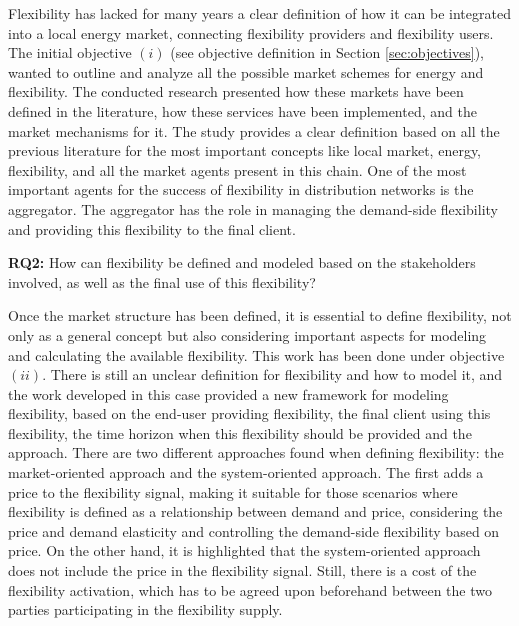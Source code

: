 Flexibility has lacked for many years a clear definition of how it can be integrated into a local energy market, connecting flexibility providers and flexibility users. The initial objective $(i)$ (see objective definition in Section \ref{sec:objectives}), wanted to outline and analyze all the possible market schemes for energy and flexibility. The conducted research presented how these markets have been defined in the literature, how these services have been implemented, and the market mechanisms for it. The study provides a clear definition based on all the previous literature for the most important concepts like local market, energy, flexibility, and all the market agents present in this chain. One of the most important agents for the success of flexibility in distribution networks is the aggregator. The aggregator has the role in managing the demand-side flexibility and providing this flexibility to the final client.

\begin{tcolorbox}

\textbf{RQ2:} How can flexibility be defined and modeled based on the stakeholders involved, as well as the final use of this flexibility?

\end{tcolorbox}
Once the market structure has been defined, it is essential to define flexibility, not only as a general concept but also considering important aspects for modeling and calculating the available flexibility. This work has been done under objective $(ii)$. There is still an unclear definition for flexibility and how to model it, and the work developed in this case provided a new framework for modeling flexibility, based on the end-user providing flexibility, the final client using this flexibility, the time horizon when this flexibility should be provided and the approach. There are two different approaches found when defining flexibility: the market-oriented approach and the system-oriented approach. The first adds a price to the flexibility signal, making it suitable for those scenarios where flexibility is defined as a relationship between demand and price, considering the price and demand elasticity and controlling the demand-side flexibility based on price. On the other hand, it is highlighted that the system-oriented approach does not include the price in the flexibility signal. Still, there is a cost of the flexibility activation, which has to be agreed upon beforehand between the two parties participating in the flexibility supply. 

